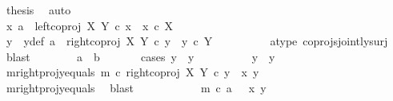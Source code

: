 \begin{isabellebody}
\ {\isacharquery}{\kern0pt}thesis\ \isamarkupfalse%
\ auto\isanewline
\ \ \ \ \ \ \ \ \isamarkupfalse%
\isanewline
\ \ \ \ \ \ \isamarkupfalse%
\isanewline
\ \ \ \ \isamarkupfalse%
\ \isanewline
\ \ \ \ \ \ \isamarkupfalse%
\ {\isachardoublequoteopen}{\isasymnexists}x{\isachardot}{\kern0pt}\ a\ {\isacharequal}{\kern0pt}\ left{\isacharunderscore}{\kern0pt}coproj\ X\ Y\ {\isasymcirc}\isactrlsub c\ x\ {\isasymand}\ x\ {\isasymin}\isactrlsub c\ X{\isachardoublequoteclose}\isanewline
\ \ \ \ \ \ \isamarkupfalse%
\ \isamarkupfalse%
\ y\ \ y{\isacharunderscore}{\kern0pt}def{\isacharcolon}{\kern0pt}\ {\isachardoublequoteopen}a\ {\isacharequal}{\kern0pt}\ right{\isacharunderscore}{\kern0pt}coproj\ X\ Y\ {\isasymcirc}\isactrlsub c\ y\ {\isasymand}\ y\ {\isasymin}\isactrlsub c\ Y{\isachardoublequoteclose}\isanewline
\ \ \ \ \ \ \ \ \isamarkupfalse%
\ a{\isacharunderscore}{\kern0pt}type\ coprojs{\isacharunderscore}{\kern0pt}jointly{\isacharunderscore}{\kern0pt}surj\ \isamarkupfalse%
\ blast\isanewline
\ \ \ \ \ \ \isamarkupfalse%
\ {\isachardoublequoteopen}a\ {\isacharequal}{\kern0pt}\ b{\isachardoublequoteclose}\isanewline
\ \ \ \ \ \ \isamarkupfalse%
{\isacharparenleft}{\kern0pt}cases\ {\isachardoublequoteopen}y\ {\isacharequal}{\kern0pt}\ y{}{\isachardoublequoteclose}{\isacharparenright}{\kern0pt}\isanewline
\ \ \ \ \ \ \ \ \isamarkupfalse%
\ {\isachardoublequoteopen}y\ {\isacharequal}{\kern0pt}\ y{}{\isachardoublequoteclose}\isanewline
\ \ \ \ \ \ \ \ \isamarkupfalse%
\ \ \isamarkupfalse%
\ m{\isacharunderscore}{\kern0pt}rightproj{\isacharunderscore}{\kern0pt}y{\isacharunderscore}{\kern0pt}equals{\isacharcolon}{\kern0pt}\ {\isachardoublequoteopen}m\ {\isasymcirc}\isactrlsub c\ right{\isacharunderscore}{\kern0pt}coproj\ X\ Y\ {\isasymcirc}\isactrlsub c\ y\ {\isacharequal}{\kern0pt}\ {\isasymlangle}x{}{\isacharcomma}{\kern0pt}\ y{}{\isasymrangle}{\isachardoublequoteclose}\isanewline
\ \ \ \ \ \ \ \ \ \ \isamarkupfalse%
\ m{\isacharunderscore}{\kern0pt}rightproj{\isacharunderscore}{\kern0pt}y{}{\isacharunderscore}{\kern0pt}equals\ \isamarkupfalse%
\ blast\isanewline
\ \ \ \ \ \ \ \ \isamarkupfalse%
\ \isamarkupfalse%
\ {\isachardoublequoteopen}m\ {\isasymcirc}\isactrlsub c\ a\ \ {\isacharequal}{\kern0pt}\ {\isasymlangle}x{}{\isacharcomma}{\kern0pt}\ y{}{\isasymrangle}{\isachardoublequoteclose}\isanewline

\end{isabellebody}
